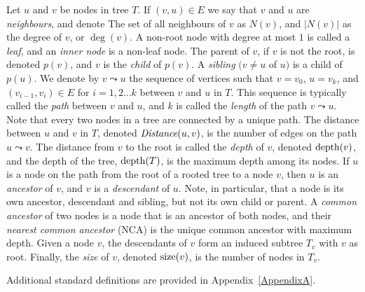 	Let $u$ and $v$ be nodes in  tree $T$. 
	If $(v,u) \in E$ we say that $v$ and $u$ are  \emph{neighbours}, and denote  The set of all neighbours of $v$ as $N(v)$, and $\vert N(v) \vert$ as the degree of $v$, or $\deg(v)$.  A non-root node with degree at most $1$ is called a  \emph{leaf}, and an \emph{inner node} is a non-leaf node. The parent of $v$, if $v$ is not the root, is denoted $p(v)$, and $v$ is the \emph{child} of $p(v)$.  A \emph{sibling} $(v \neq u$ of $u)$  is a child of $p(u)$.
	We denote by $v \leadsto u$ the  sequence   of vertices such that $v = v_0$, $u = v_k$, and $(v_{i-1},v_{i})\in E$ for $ i= 1,2 \dots k$ between $v$ and $u$ in $T$. This sequence is typically called the \emph{path} between $v$ and $u$, and $k$ is called the \emph{length} of the path $v \leadsto u$. Note that   every two nodes in a tree are connected by a unique path.
The distance between $u$ and $v$ in $T$, denoted $\emph{Distance}(u, v)$, is the number of edges on the path  $u \leadsto v $. The distance from  $v$ to the root is called the \emph{depth} of $v$, denoted $\operatorname{depth}(v)$, and the depth of the tree, $\operatorname{depth}(T)$, is the maximum depth among its nodes.
	If $u$ is a node on the path from the root of a rooted tree to a node $v$, then $u$ is an \emph{ancestor} of $v$, and $v$ is a \emph{descendant} of $u$. Note, in particular, that a node is its own ancestor, descendant and sibling, but not its own child or parent. A \emph{common ancestor} of two nodes is a node that is an ancestor of both nodes, and their \emph{nearest common ancestor} (NCA) is the unique common ancestor with maximum depth. Given a node $v$, the descendants of $v$ form an induced subtree $T_v$ with $v$ as root.  Finally, the \emph{size} of $v$, denoted $\operatorname{size}(v)$, is the number of nodes in $T_v$.
	
	Additional standard definitions are provided in Appendix~\ref{AppendixA}.
